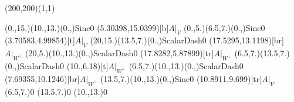 \unitlength=1bp%

\begin{feynartspicture}(200,200)(1,1)

\FADiagram{}
\FAProp(0.,15.)(10.,13.)(0.,){Sine}{0}
\FALabel(5.30398,15.0399)[b]{$A|_V$}
\FAProp(0.,5.)(6.5,7.)(0.,){Sine}{0}
\FALabel(3.70583,4.99854)[t]{$A|_V$}
\FAProp(20,15.)(13.5,7.)(0.,){ScalarDash}{0}
\FALabel(17.5295,13.1198)[br]{$A|_{W^\perp}$}
\FAProp(20,5.)(10.,13.)(0.,){ScalarDash}{0}
\FALabel(17.8282,5.87899)[tr]{$A|_{W^\perp}$}
\FAProp(6.5,7.)(13.5,7.)(0.,){ScalarDash}{0}
\FALabel(10.,6.18)[t]{$A|_{W^\perp}$}
\FAProp(6.5,7.)(10.,13.)(0.,){ScalarDash}{0}
\FALabel(7.69355,10.1246)[br]{$A|_{W^\perp}$}
\FAProp(13.5,7.)(10.,13.)(0.,){Sine}{0}
\FALabel(10.8911,9.699)[tr]{$A|_V$}
\FAVert(6.5,7.){0}
\FAVert(13.5,7.){0}
\FAVert(10.,13.){0}
\end{feynartspicture}

